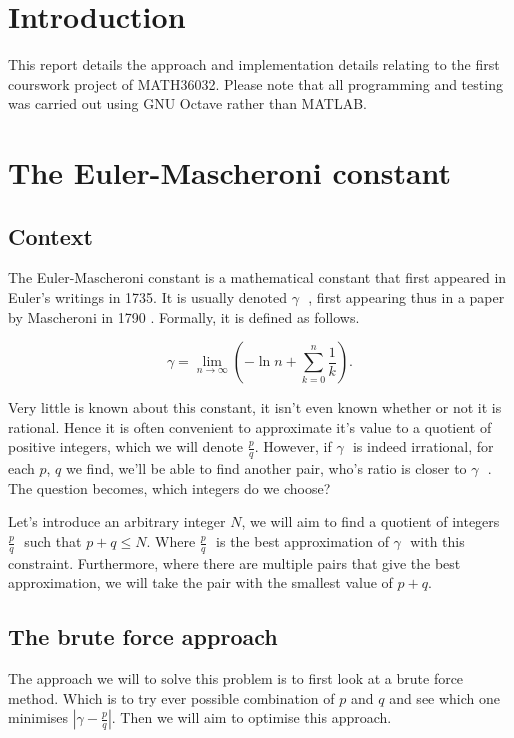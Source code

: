 \documentclass[10pt]{article}
\newcommand*{\gam}{$\gamma \text{ }$}
\newcommand*{\pdivq}{$\frac{p}{q} \text{ }$}
\begin{document}
\section{Introduction}

This report details the approach and implementation details relating to the first courswork project of MATH36032. Please note that all programming and testing was carried out using GNU Octave rather than MATLAB.
\section{The Euler-Mascheroni constant}

\subsection{Context}
The Euler-Mascheroni constant is a mathematical constant that first appeared in Euler's writings in 1735. It is usually denoted \gam, first appearing thus in a paper by Mascheroni in 1790 \cite{eulerconst}. Formally, it is defined as follows.

\begin{equation}
\gamma = \lim_{n \to \infty}  \left( -\ln{n} + \sum_{k=0}^{n} \frac{1}{k}  \right).
\end{equation}

Very little is known about this constant, it isn't even known whether or not it is rational. Hence it is often convenient to approximate it's value to a quotient of positive integers, which we will denote $ \frac{p}{q}$. However, if \gam is indeed irrational, for each $p$, $q$ we find, we'll be able to find another pair, who's ratio is closer to \gam. The question becomes, which integers do we choose?

Let's introduce an arbitrary integer $N$, we will aim to find a quotient of integers \pdivq such that $p + q \leq N$. Where \pdivq is the best approximation of \gam with this constraint. Furthermore, where there are multiple pairs that give the best approximation, we will take the pair with the smallest value of $p+q$.

\subsection{The brute force approach}

The approach we will to solve this problem is to first look at a brute force method. Which is to try ever possible combination of $p$ and $q$ and see which one minimises $ | \gamma - \frac{p}{q} |$. Then we will aim to optimise this approach.
\end{document}
